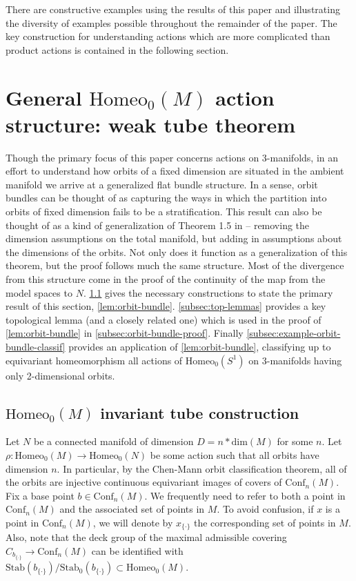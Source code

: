 \documentclass[10pt, oneside]{article}
\newcommand{\homeo}[1][S^1]{\text{Homeo}_0(#1)}
\newcommand{\conf}[2][S^1]{\text{Conf}_{#2}(#1)}
\newcommand{\set}{{\{\cdot\}}}
\newcommand{\stab}[1]{\text{Stab}(#1)}
\newcommand{\pstab}[1]{\text{Stab}_0(#1)}
\newcommand{\maxcov}{C_{b_\set}}
\theoremstyle{definition}
\theoremstyle{definition}
\begin{document}
There are constructive examples using the results of this paper and illustrating the diversity of examples possible throughout the remainder of the paper. The key construction for understanding actions which are more complicated than product actions is contained in the following section.


\section{General \texorpdfstring{$\homeo[M]$}{Homeo\_0(M)} action structure: weak tube theorem}\label{sec:orbit-bundle-lemma}
Though the primary focus of this paper concerns actions on 3-manifolds, in an effort to understand how orbits of a fixed dimension are situated in the ambient manifold we arrive at a generalized flat bundle structure. In a sense, orbit bundles can be thought of as capturing the ways in which the partition into orbits of fixed dimension fails to be a stratification. This result can also be thought of as a kind of generalization of Theorem 1.5 in \cite{chen:StructureTheorems} -- removing the dimension assumptions on the total manifold, but adding in assumptions about the dimensions of the orbits. Not only does it function as a generalization of this theorem, but the proof follows much the same structure. Most of the divergence from this structure come in the proof of the continuity of the map from the model spaces to $N$. \cref{subsec:orbit-bundle-construction} gives the necessary constructions to state the primary result of this section, \cref{lem:orbit-bundle}. \cref{subsec:top-lemmas} provides a key topological lemma (and a closely related one) which is used in the proof of \cref{lem:orbit-bundle} in \cref{subsec:orbit-bundle-proof}. Finally \cref{subsec:example-orbit-bundle-classif} provides an application of \cref{lem:orbit-bundle}, classifying up to equivariant homeomorphism all actions of $\homeo$ on 3-manifolds having only 2-dimensional orbits.

\subsection{\texorpdfstring{$\homeo[M]$}{Homeo\_0(M)} invariant tube construction}\label{subsec:orbit-bundle-construction}
Let $N$ be a connected manifold of dimension $D=n*\text{dim}(M)$ for some $n$. Let $\rho:\homeo[M]\to\homeo[N]$ be some action such that all orbits have dimension $n$. In particular, by the Chen-Mann orbit classification theorem, all of the orbits are injective continuous equivariant images of covers of $\conf[M]{n}$.
Fix a base point $b\in \conf[M]{n}$.
We frequently need to refer to both a point in $\conf[M]{n}$
and the associated set of points in $M$.
To avoid confusion,
if $x$ is a point in $\conf[M]{n}$,
we will denote by $x_\set$ the corresponding set of points in $M$.
Also,
note that the deck group of the maximal admissible covering $\maxcov \to \conf[M]{n}$ can be identified with $\stab{b_\set}/\pstab{b_\set}\subset\homeo[M]$.
\end{document}
